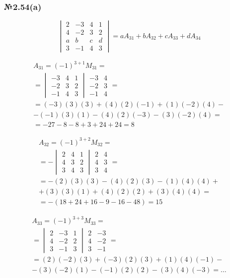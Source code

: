 \documentclass{article}
\begin{document}
\subsubsection*{№2.54(a)}

\[
	\begin{vmatrix}
	2 & -3 & 4 & 1 \\
	4 & -2 & 3 & 2 \\
	a & b & c & d \\
		3 & -1 & 4 & 3
	\end{vmatrix}
	= a A_{31} + b A_{32} + c A_{33} + d A_{34}
\]

\begin{gather*}
	A_{31} = (-1)^{3+1} M_{31} = \\
	= \begin{vmatrix}
		-3 & 4 & 1 \\
		-2 & 3 & 2 \\
		-1 & 4 & 3
	\end{vmatrix}
	\begin{matrix}
		-3 & 4 \\
		-2 & 3 \\
		-1 & 4
	\end{matrix} = \\
	= (-3)(3)(3) + (4)(2)(-1) + (1)(-2)(4) - \\
	- (-1)(3)(1) - (4)(2)(-3) - (3)(-2)(4) = \\
	= -27 - 8 - 8 + 3 + 24 + 24 = 8
\end{gather*}

\begin{gather*}
	A_{32} = (-1)^{3+2} M_{32} = \\
	= -\begin{vmatrix}
		2 & 4 & 1 \\
		4 & 3 & 2 \\
		3 & 4 & 3
	\end{vmatrix}
	\begin{matrix}
		2 & 4 \\
		4 & 3 \\
		3 & 4
	\end{matrix} = \\
	= -(2)(3)(3) - (4)(2)(3) - (1)(4)(4) + \\
	+ (3)(3)(1) + (4)(2)(2) + (3)(4)(4) = \\
	= -(18 + 24 + 16 - 9 - 16 - 48) = 15	
\end{gather*}

\begin{gather*}
	A_{33} = (-1)^{3+3} M_{33} = \\
	= \begin{vmatrix}
		2 & -3 & 1 \\
		4 & -2 & 2 \\
		3 & -1 & 3
	\end{vmatrix}
	\begin{matrix}
		2 & -3 \\
		4 & -2 \\
		3 & -1
	\end{matrix} = \\
	= (2)(-2)(3) + (-3)(2)(3) + (1)(4)(-1) - \\
	- (3)(-2)(1) - (-1)(2)(2) - (3)(4)(-3) = \dots
\end{gather*}
\end{document}
